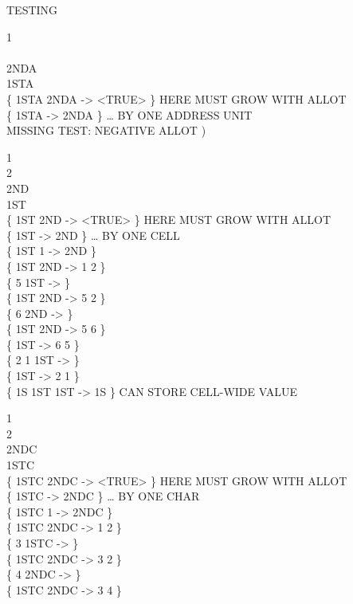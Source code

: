 \begin{tt}
TESTING \small {} \word{,}  \word{!}            \word{+!} 

 1  \\
 \\
 2NDA \\
 1STA \\
\{ 1STA 2NDA  -> <TRUE> \}	\tab {} HERE MUST GROW WITH ALLOT \\
\{ 1STA  -> 2NDA \}			\tab[4.2]  {\ldots} BY ONE ADDRESS UNIT \\
 MISSING TEST: NEGATIVE ALLOT )

 1 \word{,} \\
 2 \word{,} \\
 2ND \\
 1ST \\
\{ 1ST 2ND  -> <TRUE> \}	\tab {} HERE MUST GROW WITH ALLOT \\
\{ 1ST  -> 2ND \}			\tab[2.6]  {\ldots} BY ONE CELL \\
\{ 1ST 1  \word{+} -> 2ND \} \\
\{ 1ST  2ND  -> 1 2 \} \\
\{ 5 1ST \word{!} -> \} \\
\{ 1ST  2ND  -> 5 2 \} \\
\{ 6 2ND \word{!} -> \} \\
\{ 1ST  2ND  -> 5 6 \} \\
\{ 1ST  -> 6 5 \} \\
\{ 2 1 1ST  -> \} \\
\{ 1ST  -> 2 1 \} \\
\{ 1S 1ST \word{!}  1ST  -> 1S \} \tab {} CAN STORE CELL-WIDE VALUE

 1  \\
 2  \\
 2NDC \\
 1STC \\
\{ 1STC 2NDC  -> <TRUE> \}	\tab {} HERE MUST GROW WITH ALLOT \\
\{ 1STC  -> 2NDC \}			\tab[2.6]  {\ldots} BY ONE CHAR \\
\{ 1STC 1  \word{+} -> 2NDC \} \\
\{ 1STC  2NDC  -> 1 2 \} \\
\{ 3 1STC  -> \} \\
\{ 1STC  2NDC  -> 3 2 \} \\
\{ 4 2NDC  -> \} \\
\{ 1STC  2NDC  -> 3 4 \}


\end{tt}
